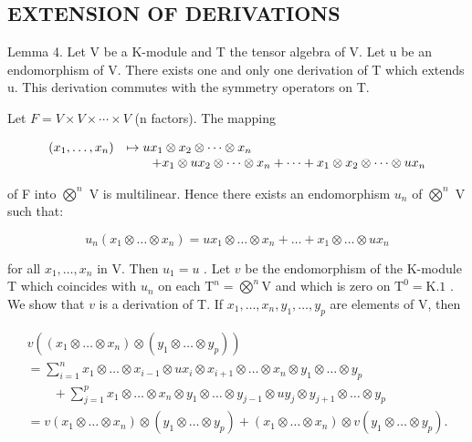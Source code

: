 \subsection{EXTENSION OF DERIVATIONS}

Lemma 4. Let V be a K-module and T the tensor algebra of V. Let u be an endomorphism of V. There exists one and only one derivation of T which extends u. This derivation commutes with the symmetry operators on T.

Let \(F = V \times V \times \cdots \times V\) (n factors). The mapping

\[
\begin{array}{r l} (x _ {1}, \ldots , x _ {n}) & \mapsto u x _ {1} \otimes x _ {2} \otimes \dots \otimes x _ {n} \\ & \qquad + x _ {1} \otimes u x _ {2} \otimes \dots \otimes x _ {n} + \dots + x _ {1} \otimes x _ {2} \otimes \dots \otimes u x _ {n} \end{array}
\]

of F into \(\bigotimes^{n}\) V is multilinear. Hence there exists an endomorphism \(u_{n}\) of \(\bigotimes^{n}\) V such that:

\[
u _ {n} \left(x _ {1} \otimes \dots \otimes x _ {n}\right) = u x _ {1} \otimes \dots \otimes x _ {n} + \dots + x _ {1} \otimes \dots \otimes u x _ {n}
\]

for all \(x_1, \ldots, x_n\) in V. Then \(u_1 = u\) . Let \(v\) be the endomorphism of the K-module T which coincides with \(u_n\) on each \(\mathrm{T}^n = \bigotimes^n \mathrm{V}\) and which is zero on \(\mathrm{T}^0 = \mathrm{K}. 1\) . We show that \(v\) is a derivation of T. If \(x_1, \ldots, x_n, y_1, \ldots, y_p\) are elements of V, then

\[
\begin{array}{l} v ((x _ {1} \otimes \dots \otimes x _ {n}) \otimes (y _ {1} \otimes \dots \otimes y _ {p})) \\ = \sum_ {i = 1} ^ {n} x _ {1} \otimes \dots \otimes x _ {i - 1} \otimes u x _ {i} \otimes x _ {i + 1} \otimes \dots \otimes x _ {n} \otimes y _ {1} \otimes \dots \otimes y _ {p} \\ \qquad + \sum_ {j = 1} ^ {p} x _ {1} \otimes \dots \otimes x _ {n} \otimes y _ {1} \otimes \dots \otimes y _ {j - 1} \otimes u y _ {j} \otimes y _ {j + 1} \otimes \dots \otimes y _ {p} \\ = v (x _ {1} \otimes \dots \otimes x _ {n}) \otimes (y _ {1} \otimes \dots \otimes y _ {p}) + (x _ {1} \otimes \dots \otimes x _ {n}) \otimes v (y _ {1} \otimes \dots \otimes y _ {p}). \end{array}
\]

